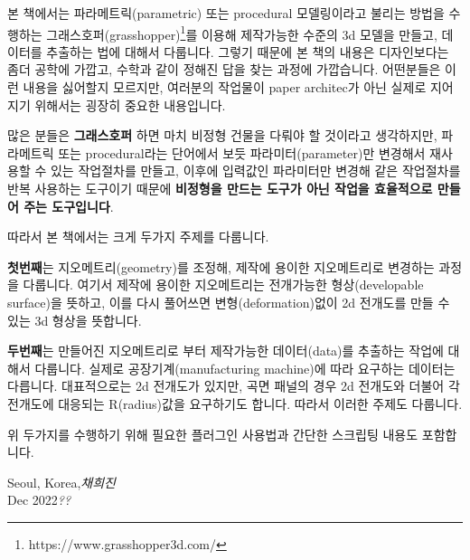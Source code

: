 %
%

\preface

본 책에서는 파라메트릭(parametric) 또는 procedural 모델링이라고 불리는 방법을 수행하는 그래스호퍼(grasshopper)\footnote{https://www.grasshopper3d.com/}를 이용해 제작가능한 수준의 3d 모델을 만들고, 데이터를 추출하는 법에 대해서 다룹니다. 그렇기 때문에 본 책의 내용은 디자인보다는 좀더 공학에 가깝고, 수학과 같이 정해진 답을 찾는 과정에 가깝습니다. 어떤분들은 이런 내용을 싫어할지 모르지만, 여러분의 작업물이 paper architec가 아닌 실제로 지어지기 위해서는 굉장히 중요한 내용입니다.

많은 분들은 \textbf{그래스호퍼} 하면 마치 비정형 건물을 다뤄야 할 것이라고 생각하지만, 파라메트릭 또는 procedural라는 단어에서 보듯 파라미터(parameter)만 변경해서 재사용할 수 있는 작업절차를 만들고, 이후에 입력값인 파라미터만 변경해 같은 작업절차를 반복 사용하는 도구이기 때문에 \textbf{비정형을 만드는 도구가 아닌 작업을 효율적으로 만들어 주는 도구입니다}.

따라서 본 책에서는 크게 두가지 주제를 다룹니다. 

\textbf{첫번째}는 지오메트리(geometry)를 조정해, 제작에 용이한 지오메트리로 변경하는 과정을 다룹니다. 여기서 제작에 용이한 지오메트리는 전개가능한 형상(developable surface)을 뜻하고, 이를 다시 풀어쓰면 변형(deformation)없이 2d 전개도를 만들 수 있는 3d 형상을 뜻합니다. 

\textbf{두번째}는 만들어진 지오메트리로 부터 제작가능한 데이터(data)를 추출하는 작업에 대해서 다룹니다. 실제로 공장기계(manufacturing machine)에 따라 요구하는 데이터는 다릅니다. 대표적으로는 2d 전개도가 있지만, 곡면 패널의 경우 2d 전개도와 더불어 각 전개도에 대응되는 R(radius)값을 요구하기도 합니다. 따라서 이러한 주제도 다룹니다.

위 두가지를 수행하기 위해 필요한 플러그인 사용법과 간단한 스크립팅 내용도 포함합니다.
\vspace{\baselineskip}
\begin{flushright}\noindent
Seoul, Korea,\hfill {\it 채희진}\\
Dec 2022\hfill {\it ??}\\
\end{flushright}


